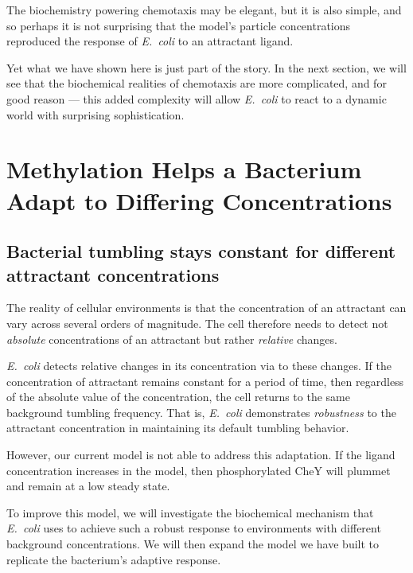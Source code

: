 The biochemistry powering chemotaxis may be elegant, but it is also simple, and so perhaps it is not surprising that the model's particle concentrations reproduced the response of \textit{E.~coli} to an attractant ligand.

Yet what we have shown here is just part of the story. In the next section, we will see that the biochemical realities of chemotaxis are more complicated, and for good reason --- this added complexity will allow \textit{E.~coli} to react to a dynamic world with surprising sophistication.\\

\FloatBarrier
{}

\section{Methylation Helps a Bacterium Adapt to Differing Concentrations}
\label{sec:methylation}

\subsection{Bacterial tumbling stays constant for different attractant concentrations}

The reality of cellular environments is that the concentration of an attractant can vary across several orders of magnitude. The cell therefore needs to detect not \textit{absolute} concentrations of an attractant but rather \textit{relative} changes.

\textit{E.~coli} detects relative changes in its concentration via  to these changes. If the concentration of attractant remains constant for a period of time, then regardless of the absolute value of the concentration, the cell returns to the same background tumbling frequency. That is, \textit{E.~coli} demonstrates \textit{robustness} to the attractant concentration in maintaining its default tumbling behavior.

However, our current model is not able to address this adaptation. If the ligand concentration increases in the model, then phosphorylated CheY will plummet and remain at a low steady state.

To improve this model, we will investigate the biochemical mechanism that \textit{E.~coli} uses to achieve such a robust response to environments with different background concentrations. We will then expand the model we have built to replicate the bacterium's adaptive response.

